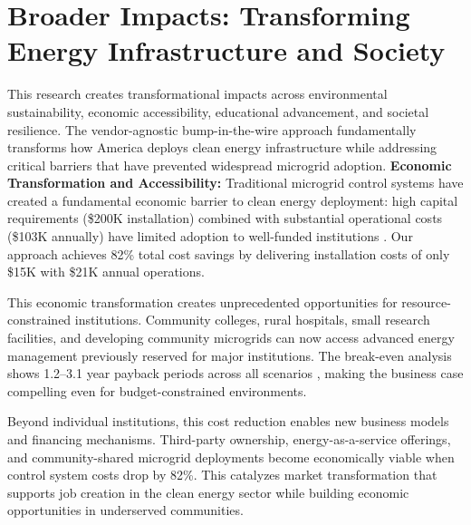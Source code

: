 \documentclass[12pt]{article}
\begin{document}
\section{Broader Impacts: Transforming Energy Infrastructure and Society}

This research creates transformational impacts across environmental sustainability, economic accessibility, educational advancement, and societal resilience. The vendor-agnostic bump-in-the-wire approach fundamentally transforms how America deploys clean energy infrastructure while addressing critical barriers that have prevented widespread microgrid adoption.
\textbf{Economic Transformation and Accessibility:} Traditional microgrid control systems have created a fundamental economic barrier to clean energy deployment: high capital requirements (\$200K installation) combined with substantial operational costs (\$103K annually) have limited adoption to well-funded institutions \cite{hirsch2018,sigrin2019}. Our approach achieves 82\% total cost savings \cite{our2024economic} by delivering installation costs of only \$15K with \$21K annual operations.

This economic transformation creates unprecedented opportunities for resource-constrained institutions. Community colleges, rural hospitals, small research facilities, and developing community microgrids can now access advanced energy management previously reserved for major institutions. The break-even analysis shows 1.2--3.1 year payback periods across all scenarios \cite{our2024economic}, making the business case compelling even for budget-constrained environments.

Beyond individual institutions, this cost reduction enables new business models and financing mechanisms. Third-party ownership, energy-as-a-service offerings, and community-shared microgrid deployments become economically viable when control system costs drop by 82\%. This catalyzes market transformation that supports job creation in the clean energy sector while building economic opportunities in underserved communities.
\end{document}
